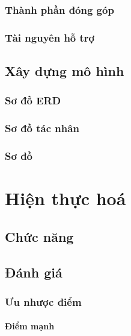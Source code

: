 \documentclass[12pt,a4paper,2sides]{report}
\begin{document}
\subsection{Thành phần đóng góp} %
\subsection{Tài nguyên hỗ trợ} %
\section{Xây dựng mô hình} %
\subsection{Sơ đồ ERD}
\subsection{Sơ đồ tác nhân}
\subsection{Sơ đồ} %
\chapter{Hiện thực hoá}
\section{Chức năng}
\subsection{}

\section{Đánh giá}
\subsection{Ưu nhược điểm}
\subsubsection{Điểm mạnh}
\end{document}

